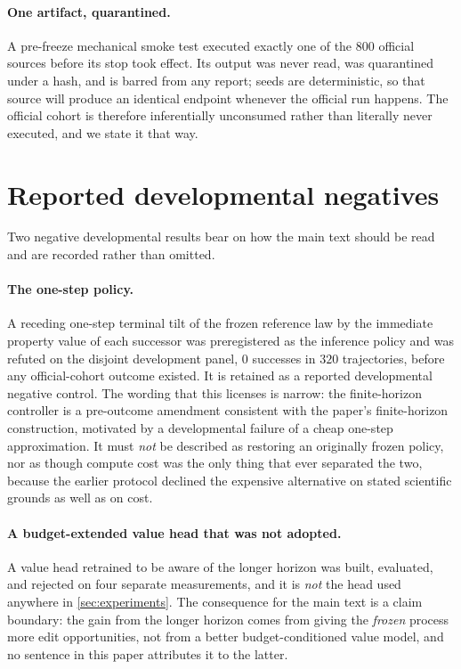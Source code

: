 \paragraph{One artifact, quarantined.}
A pre-freeze mechanical smoke test executed exactly one of the $800$ official sources before its stop took effect.
Its output was never read, was quarantined under a hash, and is barred from any report; seeds are deterministic, so that source will produce an identical endpoint whenever the official run happens.
The official cohort is therefore inferentially unconsumed rather than literally never executed, and we state it that way.

\section{Reported developmental negatives}
\label{app:negatives}

Two negative developmental results bear on how the main text should be read and are recorded rather than omitted.

\paragraph{The one-step policy.}
A receding one-step terminal tilt of the frozen reference law by the immediate property value of each successor was preregistered as the inference policy and was refuted on the disjoint development panel, $0$ successes in $320$ trajectories, before any official-cohort outcome existed.
It is retained as a reported developmental negative control.
The wording that this licenses is narrow: the finite-horizon controller is a pre-outcome amendment consistent with the paper's finite-horizon construction, motivated by a developmental failure of a cheap one-step approximation.
It must \emph{not} be described as restoring an originally frozen policy, nor as though compute cost was the only thing that ever separated the two, because the earlier protocol declined the expensive alternative on stated scientific grounds as well as on cost.

\paragraph{A budget-extended value head that was not adopted.}
A value head retrained to be aware of the longer horizon was built, evaluated, and rejected on four separate measurements, and it is \emph{not} the head used anywhere in \cref{sec:experiments}.
The consequence for the main text is a claim boundary: the gain from the longer horizon comes from giving the \emph{frozen} process more edit opportunities, not from a better budget-conditioned value model, and no sentence in this paper attributes it to the latter.

